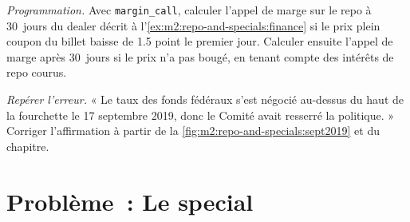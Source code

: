 \begin{exercise}[$\star\star\star$]\label{exo:m2:repo-and-specials:7}
\emph{Programmation.} Avec \texttt{margin\_call}, calculer l'appel de marge sur le repo à 30~jours
du dealer décrit à l'\cref{ex:m2:repo-and-specials:finance} si le prix plein coupon du billet
baisse de 1.5 point le premier jour. Calculer ensuite l'appel de marge après 30~jours si le prix
n'a pas bougé, en tenant compte des intérêts de repo courus.
\end{exercise}

\begin{exercise}[$\star\star\star$]\label{exo:m2:repo-and-specials:8}
\emph{Repérer l'erreur.} « Le taux des fonds fédéraux s'est négocié au-dessus du haut de la
fourchette le 17 septembre 2019, donc le Comité avait resserré la politique. »
Corriger l'affirmation à partir de la \cref{fig:m2:repo-and-specials:sept2019} et du chapitre.
\end{exercise}

\section{Problème~: Le special}

